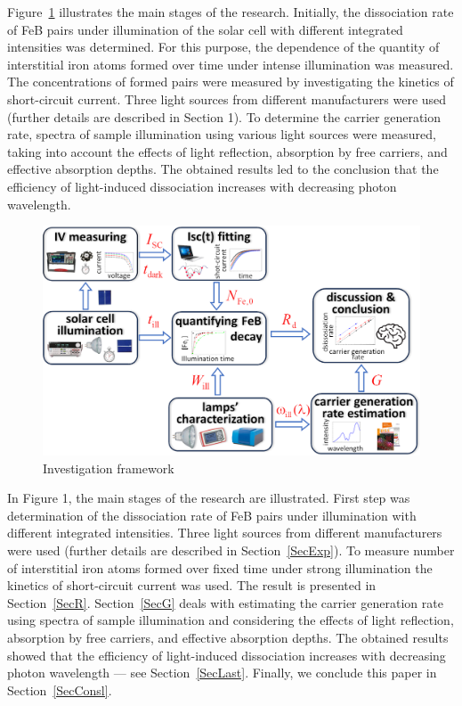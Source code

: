 \documentclass{WileyMSP-template}
\begin{document}
Figure~\ref{fig1} illustrates the main stages of the research. Initially, the dissociation rate of FeB pairs under illumination of the solar cell with different integrated intensities was determined. For this purpose, the dependence of the quantity of interstitial iron atoms formed over time under intense illumination was measured. The concentrations of formed pairs were measured by investigating the kinetics of short-circuit current. Three light sources from different manufacturers were used (further details are described in Section 1).
To determine the carrier generation rate, spectra of sample illumination using various light sources were measured, taking into account the effects of light reflection, absorption by free carriers, and effective absorption depths. The obtained results led to the conclusion that the efficiency of light-induced dissociation increases with decreasing photon wavelength.

\begin{figure}
\centering
  \includegraphics[width=0.5\linewidth]{Fig1.png}
  \caption{Investigation framework}
  \label{fig1}
\end{figure}

In Figure 1, the main stages of the research are illustrated.
First step was determination of the dissociation rate of FeB pairs under illumination with different integrated intensities.
Three light sources from different manufacturers were used (further details are described in Section~\ref{SecExp}).
To measure number of interstitial iron atoms formed over fixed time under strong illumination the kinetics of short-circuit current was used.
The result is presented in Section~\ref{SecR}.
Section~\ref{SecG} deals with estimating the carrier generation rate using spectra of sample illumination and considering the effects of light reflection, absorption by free carriers, and effective absorption depths.
The obtained results showed that the efficiency of light-induced dissociation increases with decreasing photon wavelength --- see Section~\ref{SecLast}.
Finally, we conclude this paper in Section~\ref{SecConsl}.
\end{document}
